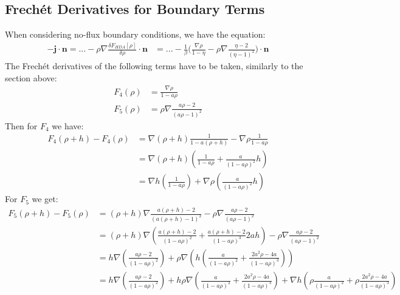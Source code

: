 \documentclass[11pt, a4paper]{article}
\theoremstyle{definition}
\newcommand{\n}{\mathbf{n}}
\begin{document}
\subsection{Frech\'et Derivatives for Boundary Terms}
When considering no-flux boundary conditions, we have the equation:
\begin{align*}
	- \mathbf{j} \cdot \n = ... -\rho \nabla \frac{\delta F_{HDA}[\rho]}{\delta \rho} \cdot \n &= ...-\frac{1}{\beta} \bigg(  \frac{\nabla \rho}{1 - \eta}  - \rho \nabla\frac{\eta - 2}{(\eta - 1)^2}  \bigg) \cdot \n
\end{align*}
The Frech\'et derivatives of the following terms have to be taken, similarly to the section above:
\begin{align*}
	F_4(\rho) &= \frac{\nabla \rho}{1 - a \rho}\\
	F_5(\rho) &= \rho \nabla\frac{a \rho - 2}{(a \rho - 1)^2}  
\end{align*}
Then for $F_4$ we have:
\begin{align*}
	F_4(\rho+h) - F_4(\rho) &=\nabla (\rho + h) \frac{1}{1 - a (\rho + h)} - \nabla \rho \frac{1}{1 - a \rho}\\
	&= \nabla(\rho + h) \left(\frac{1}{1 - a\rho} + \frac{a}{(1 -a \rho)^2}h \right)\\
	&= \nabla h \left(\frac{1}{1 - a\rho}\right) + \nabla \rho \left( \frac{a}{(1 -a \rho)^2}h \right)
\end{align*}
For $F_5$ we get:
\begin{align*}
	F_5(\rho + h) - F_5(\rho) &= (\rho + h) \nabla\frac{a (\rho +h) - 2}{(a (\rho +h) - 1)^2}  - \rho \nabla\frac{a \rho - 2}{(a \rho - 1)^2} \\
	&=(\rho + h) \nabla \left( \frac{a (\rho +h) - 2}{(1- a \rho)^2} + \frac{a (\rho +h) - 2}{(1- a \rho)^3} 2ah\right) - \rho \nabla\frac{a \rho - 2}{(a \rho - 1)^2} \\
	&= h \nabla \left(\frac{a \rho  - 2}{(1- a \rho)^2}\right) + \rho \nabla \left( h\left( \frac{a}{(1- a \rho)^2} + \frac{2a^2\rho - 4a}{(1- a \rho)^3} \right)\right)\\
	&= h \nabla \left(\frac{a \rho  - 2}{(1- a \rho)^2}\right) + h \rho \nabla \left( \frac{a}{(1- a \rho)^2} + \frac{2a^2\rho - 4a}{(1- a \rho)^3} \right) + \nabla h \left( \rho \frac{a}{(1- a \rho)^2} + \rho\frac{2a^2\rho - 4a}{(1- a \rho)^3} \right)
\end{align*}
\end{document}
